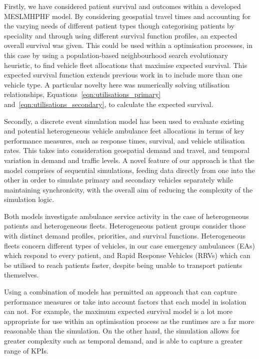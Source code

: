 \documentclass[preprint,12pt]{elsarticle}
\begin{document}
Firstly, we have considered patient survival and outcomes within a developed
MESLMHPHF model. By considering geospatial travel times and accounting for the
varying needs of different patient types though categorising patients by
speciality and through using different survival function profiles, an expected
overall survival was given. This could be used within a optimisation
processes, in this case by using a population-based neighbourhood search
evolutionary heuristic, to find vehicle fleet allocations that maximise
expected survival. This expected survival function extends previous work in
\cite{Knight2012918} to include more than one vehicle type.
A particular novelty here was numerically solving utilisation relationships,
Equations~\ref{eqn:utilisations_primary} and~\ref{eqn:utilisations_secondary},
to calculate the expected survival.

Secondly, a discrete event simulation model has been used to evaluate existing
and potential heterogeneous vehicle ambulance feet allocations in terms of key
performance measures, such as response times, survival, and vehicle
utilisation rates. This takes into consideration geospatial demand and travel,
and temporal variation in demand and traffic levels. A novel feature of our
approach is that the model comprises of sequential simulations, feeding data
directly from one into the other in order to simulate primary and secondary
vehicles separately while maintaining synchronicity, with the overall aim of
reducing the complexity of the simulation logic.

Both models investigate ambulance service activity in the case of
heterogeneous patients and heterogeneous fleets. Heterogeneous patient groups
consider those with distinct demand profiles, priorities, and survival
functions. Heterogeneous fleets concern different types of vehicles, in our
case emergency ambulances (EAs) which respond to every patient, and Rapid
Response Vehicles (RRVs) which can be utilised to reach patients faster,
despite being unable to transport patients themselves.

Using a combination of models has permitted an approach that can capture
performance measures or take into account factors that each model in isolation
can not. For example, the maximum expected survival model is a lot more
appropriate for use within an optimisation process as the runtimes are a far
more reasonable than the simulation. On the other hand, the simulation allows
for greater complexity such as temporal demand, and is able to capture a
greater range of KPIs.
\end{document}
